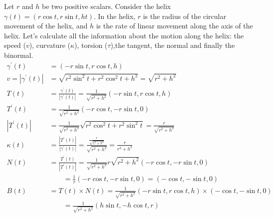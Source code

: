 \documentclass[fleqn,letterpaper]{report}
\begin{document}
\begin{example} 
Let $r$ and $h$ be two positive scalars. Consider the helix
$\gamma(t) = (r\cos t, r\sin t, ht)$. In the helix, $r$ is the
radius of the circular movement of the helix, and $h$ is the
rate of linear movement along the axis of the helix. Let's
calculate all the information about the motion along the
helix: the speed ($v$), curvature
($\kappa$), torsion ($\tau$),the tangent, the normal and
finally the binormal.
\begin{align*}
\gamma^\prime(t) & = (-r \sin t, r \cos t, h) \\
v = |\gamma^\prime(t)| & = \sqrt{r^2 \sin^2 t + r^2 \cos^2 t + h^2}
= \sqrt{r^2 + h^2} \\
T(t) & = \frac{\gamma^\prime(t)}{|\gamma^\prime(t)|} =
\frac{1}{\sqrt{r^2+h^2}} (-r \sin t, r \cos t, h) \\
T^\prime(t) & = \frac{1}{\sqrt{r^2 + h^2}} ( -r \cos t, -r \sin t,
0) \\
|T^\prime(t)| & = \frac{1}{\sqrt{r^2 + h^2}} \sqrt{r^2 \cos^2 t +
r^2 \sin^2 t} = \frac{r}{\sqrt{r^2 + h^2}} \\
\kappa(t) & = \frac{|T^\prime(t)|}{|\gamma^\prime(t)|} =
\frac{\frac{r}{\sqrt{r^2 + h^2}}}{\sqrt{r^2 + h^2}} =
\frac{r}{r^2 + h^2} \\
N(t) & = \frac{ T^\prime(t)}{|T^\prime(t)|} =
\frac{1}{\sqrt{r^2+h^2}}{r}{\sqrt{r^2 + h^2}} (-r\cos t, -r \sin
t, 0) \\
& \quad \quad = \frac{1}{r} (-r \cos t, -r \sin t, 0) = (-\cos t, -\sin
t, 0) \\
B(t) & = T(t) \times N(t) = \frac{1}{\sqrt{r^2 + h^2}} (-r \sin
t, r \cos t, h) \times (-\cos t, - \sin t, 0) \\
& \quad \quad = \frac{1}{\sqrt{r^2 +
h^2}} (h \sin t, -h \cos t, r) 
\end{align*}


\end{example}
\end{document}
